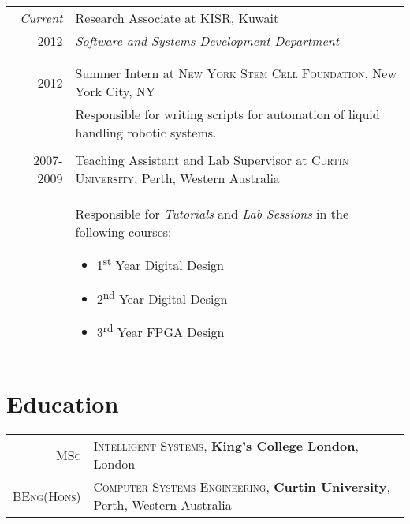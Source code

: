 \documentclass[a4paper,10pt]{article} %
\begin{document}
\begin{tabular}{r|p{11cm}}
\emph{Current} & Research Associate at \textsc{KISR}, Kuwait \\
\textsc{2012} & \emph{Software and Systems Development Department}\\ 
& \footnotesize{}\\
\multicolumn{2}{c}{} \\


\textsc{2012} & Summer Intern at \textsc{New York Stem Cell Foundation}, New York City, NY \emph{}\\
& \footnotesize{Responsible for writing scripts for automation of liquid handling robotic systems.}\\
\multicolumn{2}{c}{} \\


\textsc{2007-2009} & Teaching Assistant and Lab Supervisor at \textsc{Curtin University}, Perth, Western Australia\emph{}\\
& \footnotesize{Responsible for \textit{Tutorials} and \textit{Lab Sessions} in the following courses:
			\begin{itemize}
				\item{1\textsuperscript{st} Year Digital Design}
				\item{2\textsuperscript{nd} Year Digital Design}
				\item{3\textsuperscript{rd} Year FPGA Design}
			\end{itemize}
			}
\end{tabular}


\section{Education}

\begin{tabular}{rl}	
\textsc{MSc} & \textsc{Intelligent Systems}, \textbf{King's College London}, London\\


\textsc{BEng(Hons)} & \textsc{Computer Systems Engineering}, \textbf{Curtin University}, Perth, Western Australia\\

\end{tabular}
\end{document}
